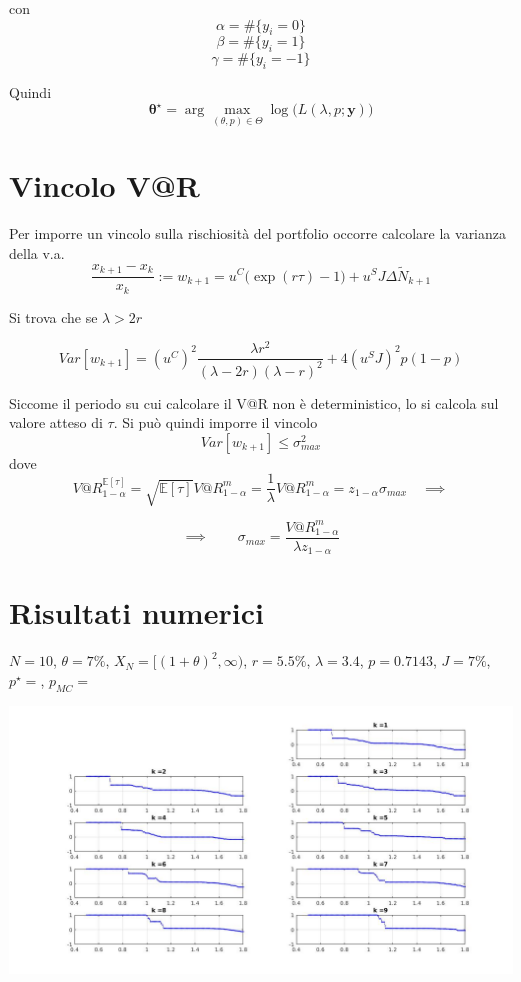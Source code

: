 \documentclass[12pt,a4paper]{article}
\theoremstyle{break}
\begin{document}
con 
\[ \alpha =  \#\{y_i = 0\}\]
\[ \beta =  \#\{y_i = 1\}\]
\[ \gamma =  \#\{y_i = -1\}\]

Quindi \[
\mathbf{\theta^{\star}} = \arg\max_{(\theta,p) \in \Theta} \log\Big( L(\lambda,p;\mathbf{y})\Big)
\]

\section{Vincolo V@R}
Per imporre un vincolo sulla rischiosità del portfolio occorre calcolare la varianza della v.a.
\begin{equation}
\frac{x_{k+1}-x_k}{x_k} := w_{k+1} = u^C\big(\exp(r \tau)-1\big) + u^S J\Delta \widetilde{N}_{k+1} 
\end{equation}

Si trova che se $ \lambda > 2 r$ 

\begin{equation}
Var[w_{k+1}] = (u^C)^2\frac{\lambda r^2}{(\lambda-2r)(\lambda-r)^2} + 4(u^S J)^2p(1-p)
\end{equation}

Siccome il periodo su cui calcolare il V@R non è deterministico, lo si calcola sul valore atteso di $\tau$. Si può quindi imporre il vincolo
\[
Var[w_{k+1}] \leq \sigma^2_{max}
\]
dove
\[
V@R^{\mathbb{E}[\tau]}_{1-\alpha} = \sqrt{\mathbb{E}[\tau]}V@R^m_{1-\alpha} = \frac{1}{\lambda}V@R^m_{1-\alpha} =  z_{1-\alpha}\sigma_{max} \quad \implies
\]

\[
\implies \qquad \boxed{\sigma_{max} = \frac{V@R^m_{1-\alpha}}{\lambda z_{1-\alpha}}}
\]

\section{Risultati numerici}
$N=10$, $\theta=7\%$, $X_N= [(1+\theta)^2,\infty)$, $r= 5.5\%$, $\lambda = 3.4$, $p = 0.7143$, $J=7\%$, $p^{\star}=$, $p_{MC} = $

\centering
\includegraphics[width=\textwidth,height=0.7\textheight]{maps.jpg}
\end{document}
